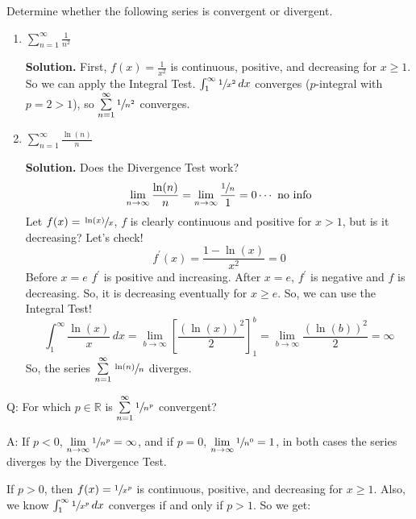 \begin{Example}{}{}
    Determine whether the following series is convergent or divergent.
    \begin{enumerate}[label=(\roman*)]
        \item $ \displaystyle \sum\limits_{n=1}^{\infty} \frac{1}{n^2} $

              \textbf{Solution.} First, $ f(x)=\frac{1}{x^2} $ is continuous, positive,
              and decreasing for $ x\geqslant 1 $. So we can apply the Integral Test.
              $ \int_{1}^{\infty} \sfrac{1}{x^2} \, d{x} $ converges ($ p $-integral
              with $ p=2>1 $), so $ \sum\limits_{n=1}^{\infty} \sfrac{1}{n^2} $ converges.
        \item $  \displaystyle\sum\limits_{n=1}^{\infty} \frac{\ln(n)}{n} $

              \textbf{Solution.} Does the Divergence Test work?
              \[ \lim\limits_{{n} \to {\infty}} \frac{\ln(n)}{n}=
                  \lim\limits_{{n} \to {\infty}} \frac{\sfrac{1}{n}}{1} =0\cdots\text{ no info} \]
              Let $ f(x)=\sfrac{\ln(x)}{x} $, $ f $ is clearly continuous and positive for $ x>1 $,
              but is it decreasing? Let's check!
              \[ f^\prime(x)=\frac{1-\ln(x)}{x^2}=0 \]
              Before $ x=e $ $ f^\prime $ is positive and increasing.
              After $ x=e $, $ f^\prime $ is negative
              and $ f $ is decreasing. So, it is decreasing eventually for $ x\geqslant e $. So,
              we can use the Integral Test!
              \[ \int_{1}^{\infty} \frac{\ln(x)}{x} \, d{x}
                  =\lim\limits_{{b} \to {\infty}} \left[ \frac{\left( \ln(x) \right)^2}{2} \right]_1^b
                  =\lim\limits_{{b} \to {\infty}} \frac{\left( \ln(b) \right)^2}{2}=\infty   \]
              So, the series $ \sum\limits_{n=1}^{\infty} \sfrac{\ln(n)}{n}  $ diverges.
    \end{enumerate}
\end{Example}

Q\@: For which $ p\in\mathbb{R} $ is $ \sum\limits_{n=1}^{\infty} \sfrac{1}{n^p} $ convergent?

A\@: If $ p<0 $, $ \lim\limits_{{n} \to {\infty}} \sfrac{1}{n^p} =\infty $, and if
$ p=0 $, $ \lim\limits_{{n} \to {\infty}} \sfrac{1}{n^0} =1 $,
in both cases the series diverges by the Divergence Test.

If $ p>0 $, then $ f(x)=\sfrac{1}{x^p} $ is continuous, positive, and decreasing
for $ x\geqslant 1 $. Also, we know $ \int_{1}^{\infty} \sfrac{1}{x^p} \, d{x}  $
converges if and only if $ p>1 $. So we get:

